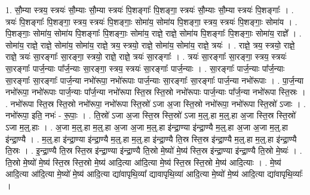 \documentclass[17pt]{extarticle}
\begin{document}
1. सौ॒म्या स्त्रय॒ स्त्रयः॑ सौ॒म्याः सौ॒म्या स्त्रयः॑ पि॒शङ्गाः᳚ पि॒शङ्गा॒ स्त्रयः॑ सौ॒म्याः सौ॒म्या स्त्रयः॑ पि॒शङ्गाः᳚ । . त्रयः॑ पि॒शङ्गाः᳚ पि॒शङ्गा॒ स्त्रय॒ स्त्रयः॑ पि॒शङ्गाः॒ सोमा॑य॒ सोमा॑य पि॒शङ्गा॒ स्त्रय॒ स्त्रयः॑ पि॒शङ्गाः॒ सोमा॑य । . पि॒शङ्गाः॒ सोमा॑य॒ सोमा॑य पि॒शङ्गाः᳚ पि॒शङ्गाः॒ सोमा॑य॒ राज्ञे॒ राज्ञे॒ सोमा॑य पि॒शङ्गाः᳚ पि॒शङ्गाः॒ सोमा॑य॒ राज्ञे᳚ । . सोमा॑य॒ राज्ञे॒ राज्ञे॒ सोमा॑य॒ सोमा॑य॒ राज्ञे॒ त्रय॒ स्त्रयो॒ राज्ञे॒ सोमा॑य॒ सोमा॑य॒ राज्ञे॒ त्रयः॑ । . राज्ञे॒ त्रय॒ स्त्रयो॒ राज्ञे॒ राज्ञे॒ त्रयः॑ सा॒रङ्गाः᳚ सा॒रङ्गा॒ स्त्रयो॒ राज्ञे॒ राज्ञे॒ त्रयः॑ सा॒रङ्गाः᳚ । . त्रयः॑ सा॒रङ्गाः᳚ सा॒रङ्गा॒ स्त्रय॒ स्त्रयः॑ सा॒रङ्गाः᳚ पार्ज॒न्याः पा᳚र्ज॒न्याः सा॒रङ्गा॒ स्त्रय॒ स्त्रयः॑ सा॒रङ्गाः᳚ पार्ज॒न्याः । . सा॒रङ्गाः᳚ पार्ज॒न्याः पा᳚र्ज॒न्याः सा॒रङ्गाः᳚ सा॒रङ्गाः᳚ पार्ज॒न्या नभो॑रूपा॒ नभो॑रूपाः पार्ज॒न्याः सा॒रङ्गाः᳚ सा॒रङ्गाः᳚ पार्ज॒न्या नभो॑रूपाः । . पा॒र्ज॒न्या नभो॑रूपा॒ नभो॑रूपाः पार्ज॒न्याः पा᳚र्ज॒न्या नभो॑रूपा स्ति॒स्र स्ति॒स्रो नभो॑रूपाः पार्ज॒न्याः पा᳚र्ज॒न्या नभो॑रूपा स्ति॒स्रः । . नभो॑रूपा स्ति॒स्र स्ति॒स्रो नभो॑रूपा॒ नभो॑रूपा स्ति॒स्रो॑ ऽजा अ॒जा स्ति॒स्रो नभो॑रूपा॒ नभो॑रूपा स्ति॒स्रो॑ ऽजाः । . नभो॑रूपा॒ इति॒ नभः॑ - रू॒पाः॒ । . ति॒स्रो॑ ऽजा अ॒जा स्ति॒स्र स्ति॒स्रो॑ ऽजा म॒ल्॒.हा म॒ल्॒.हा अ॒जा स्ति॒स्र स्ति॒स्रो॑ ऽजा म॒ल्॒.हाः । . अ॒जा म॒ल्॒.हा म॒ल्॒.हा अ॒जा अ॒जा म॒ल्॒.हा इ॑न्द्रा॒ण्या इ॑न्द्रा॒ण्यै म॒ल्॒.हा अ॒जा अ॒जा म॒ल्॒.हा इ॑न्द्रा॒ण्यै । . म॒ल्॒.हा इ॑न्द्रा॒ण्या इ॑न्द्रा॒ण्यै म॒ल्॒.हा म॒ल्॒.हा इ॑न्द्रा॒ण्यै ति॒स्र स्ति॒स्र इ॑न्द्रा॒ण्यै म॒ल्॒.हा म॒ल्॒.हा इ॑न्द्रा॒ण्यै ति॒स्रः । . इ॒न्द्रा॒ण्यै ति॒स्र स्ति॒स्र इ॑न्द्रा॒ण्या इ॑न्द्रा॒ण्यै ति॒स्रो मे॒ष्यो॑ मे॒ष्य॑ स्ति॒स्र इ॑न्द्रा॒ण्या इ॑न्द्रा॒ण्यै ति॒स्रो मे॒ष्यः॑ । . ति॒स्रो मे॒ष्यो॑ मे॒ष्य॑ स्ति॒स्र स्ति॒स्रो मे॒ष्य॑ आदि॒त्या आ॑दि॒त्या मे॒ष्य॑ स्ति॒स्र स्ति॒स्रो मे॒ष्य॑ आदि॒त्याः । . मे॒ष्य॑ आदि॒त्या आ॑दि॒त्या मे॒ष्यो॑ मे॒ष्य॑ आदि॒त्या द्या॑वापृथि॒व्या᳚ द्यावापृथि॒व्या॑ आदि॒त्या मे॒ष्यो॑ मे॒ष्य॑ आदि॒त्या द्या॑वापृथि॒व्याः᳚ । \newline
\end{document}
